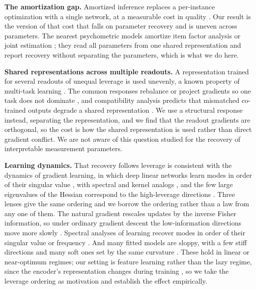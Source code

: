 \documentclass[twocolumn,10pt]{article}
\begin{document}
\textbf{The amortization gap.} Amortized inference replaces a per-instance optimization with
a single network, at a measurable cost in quality \citep{kingma2014,cremer2018}. Our result
is the version of that cost that falls on parameter recovery and is uneven across
parameters. The nearest psychometric models amortize item factor analysis
\citep{urban2021} or joint estimation \citep{molenaar2025}; they read all parameters from
one shared representation and report recovery without separating the parameters, which is
what we do here.

\textbf{Shared representations across multiple readouts.} A representation trained for
several readouts of unequal leverage is used unevenly, a known property of multi-task
learning \citep{caruana1997,ruder2017}. The common responses rebalance or project gradients
so one task does not dominate \citep{chen2018,yu2020}, and compatibility analysis predicts
that mismatched co-trained outputs degrade a shared representation \citep{standley2020}. We
use a structural response instead, separating the representation, and we find that the
readout gradients are orthogonal, so the cost is how the shared representation is used
rather than direct gradient conflict. We are not aware of this question studied for the
recovery of interpretable measurement parameters.

\textbf{Learning dynamics.} That recovery follows leverage is consistent with the dynamics
of gradient learning, in which deep linear networks learn modes in order of their singular
value \citep{saxe2014,advani2017}, with spectral and kernel analogs
\citep{rahaman2019,jacot2018}, and the few large eigenvalues of the Hessian correspond to
the high-leverage directions \citep{sagun2017}. Three lenses give the same ordering and we
borrow the ordering rather than a law from any one of them. The natural gradient rescales
updates by the inverse Fisher information, so under ordinary gradient descent the
low-information directions move more slowly \citep{amari1998}. Spectral analyses of learning
recover modes in order of their singular value or frequency \citep{saxe2014,cao2019}. And
many fitted models are sloppy, with a few stiff directions and many soft ones set by the
same curvature \citep{transtrum2015}. These hold in linear or near-optimum regimes; our
setting is feature learning rather than the lazy regime, since the encoder's representation
changes during training \citep{damian2022}, so we take the leverage ordering as motivation
and establish the effect empirically.
\end{document}

